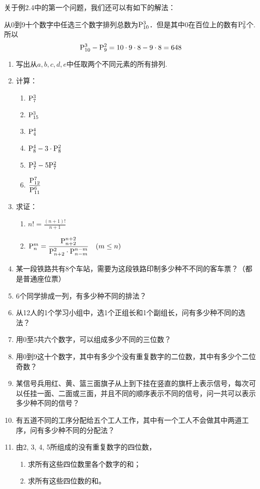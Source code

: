 关于例2.4中的第一个问题，我们还可以有如下的解法：

从0到9十个数字中任选三个数字排列总数为${\rm P}^{3}_{10}$．但是其中0在百位上的数有${\rm P}^{2}_{9}$个. 所以
\[{\rm P}^{3}_{10}-{\rm P}^{2}_{9}=10\cdot 9\cdot 8-9\cdot 8=648\]

\begin{ex}
\begin{enumerate}
    \item 写出从$a,b,c,d,e$中任取两个不同元素的所有排列.
    \item 计算：
\begin{multicols}{3}
\begin{enumerate}[(1)]
    \item ${\rm P}^{3}_{7}$
    \item ${\rm P}^{3}_{15}$
    \item ${\rm P}^{4}_{4}$
    \item ${\rm P}^{4}_{8}-3\cdot{\rm P}^{2}_{8}$
    \item ${\rm P}^{3}_{7}-5{\rm P}^{2}_{7}$
    \item $\dfrac{{\rm P}^{7}_{12}}{{\rm P}^{6}_{11}}$
\end{enumerate}
\end{multicols}

\item 求证：
\begin{enumerate}[(1)]
    \item $n!=\frac{(n+1)!}{n+1}$
    \item ${\rm P}^{m}_{n}=\dfrac{{\rm P}^{n+2}_{n+2}}{{\rm P}^{2}_{n+2}\cdot {\rm P}^{n-m}_{n-m}}\quad (m\le n)$
\end{enumerate}

\item 某一段铁路共有8个车站，需要为这段铁路印制多少种不不同的客车票？（都是普通座位票）
\item 6个同学排成一列，有多少种不同的排法？
\item 从12人的1个学习小组中，选1个正组长和1个副组长，问有多少种不同的选法？
\item 用0至5共六个数字，可以组成多少不同的三位数？
\item 用0到9这十个数字，其中有多少个没有重复数字的二位数，其中有多少个二位奇数？
\item 某信号兵用红、黄、篮三面旗子从上到下挂在竖直的旗杆上表示信号，每次可以任挂一面、二面或三面，并且不同的顺序表示不同的信号，问一共可以表示多少种不同的信号？
\item 有五道不同的工序分配给五个工人工作，其中有一个工人不会做其中两道工序，问有多少种不同的分配法？
\item 由2, 3, 4, 5所组成的没有重复数字的四位数，
\begin{enumerate}[(1)]
\item 求所有这些四位数里各个数字的和；
\item 求所有这些四位数的和。
\end{enumerate}
\end{enumerate}
\end{ex}

